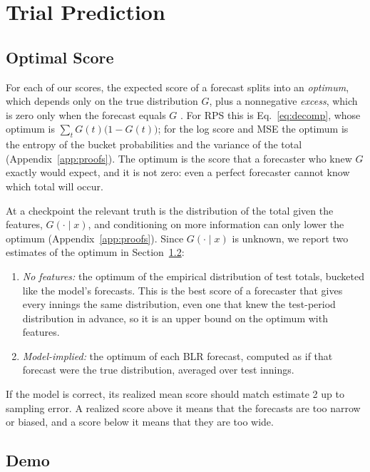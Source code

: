\documentclass{article}
\newcommand{\1}{\mathbf{1}}
\begin{document}
\section{Trial Prediction}\label{sec:trial}
\subsection{Optimal Score}\label{sec:optimal}
For each of our scores, the expected score of a forecast splits into an \emph{optimum}, which depends only on the true distribution $G$, plus a nonnegative \emph{excess}, which is zero only when the forecast equals $G$ \citep{gneiting2007}. For RPS this is Eq.~\eqref{eq:decomp}, whose optimum is $\sum_t G(t)\big(1 - G(t)\big)$; for the log score and MSE the optimum is the entropy of the bucket probabilities and the variance of the total (Appendix~\ref{app:proofs}). The optimum is the score that a forecaster who knew $G$ exactly would expect, and it is not zero: even a perfect forecaster cannot know which total will occur.

At a checkpoint the relevant truth is the distribution of the total given the features, $G(\cdot \mid x)$, and conditioning on more information can only lower the optimum (Appendix~\ref{app:proofs}). Since $G(\cdot \mid x)$ is unknown, we report two estimates of the optimum in Section~\ref{sec:demo}:
\begin{enumerate}
\item \emph{No features:} the optimum of the empirical distribution of test totals, bucketed like the model's forecasts. This is the best score of a forecaster that gives every innings the same distribution, even one that knew the test-period distribution in advance, so it is an upper bound on the optimum with features.
\item \emph{Model-implied:} the optimum of each BLR forecast, computed as if that forecast were the true distribution, averaged over test innings.
\end{enumerate}
If the model is correct, its realized mean score should match estimate 2 up to sampling error. A realized score above it means that the forecasts are too narrow or biased, and a score below it means that they are too wide.

\subsection{Demo}\label{sec:demo}
\end{document}
